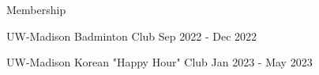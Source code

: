 \documentclass{resume} %
\begin{document}


\begin{rSection}{Membership} \itemsep -3pt
\item UW-Madison Badminton Club \hfill{Sep 2022 - Dec 2022}
\item UW-Madison Korean "Happy Hour" Club \hfill{Jan 2023 - May 2023}
\end{rSection}
\end{document}
